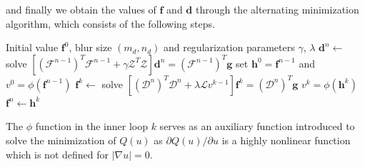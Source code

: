 \documentclass[12pt,notitlepage]{report}
\begin{document}
and finally we obtain the values of $\mathbf{f}$ and $\mathbf{d}$ through the alternating minimization algorithm, which consists of the following steps.
\begin{algorithmic}
	\REQUIRE Initial value $\mathbf{f}^0$, blur size $(m_d, n_d)$ and regularization parameters $\gamma$, $\lambda$
		\STATE $\mathbf{d}^n \gets$ solve $[(\mathcal{F}^{n - 1})^T \mathcal{F}^{n - 1} + \gamma \mathcal{Z}^T \mathcal{Z} ] \mathbf{d}^n = (\mathcal{F}^{n - 1})^T \mathbf{g}$ 
		\STATE set $\mathbf{h}^0 = \mathbf{f}^{n - 1}$ and $v^0 = \phi(\mathbf{f}^{n - 1})$ 
			\STATE $\mathbf{f}^k \gets$ solve $[(\mathcal{D}^n)^T \mathcal{D}^n + \lambda \mathcal{L} v^{k-1} ] \mathbf{f}^k = (\mathcal{D}^n)^T \mathbf{g}$
			\STATE $v^k = \phi(\mathbf{h}^k)$
		\ENDFOR
		\STATE $\mathbf{f}^n \gets \mathbf{h}^k$
	\ENDFOR
\end{algorithmic}

The $\phi$ function in the inner loop $k$ serves as an auxiliary function introduced to solve the minimization of $Q(u)$ as $\partial Q(u) / \partial u$ is a highly nonlinear function which is not defined for $|\nabla u| = 0$. 
\end{document}
